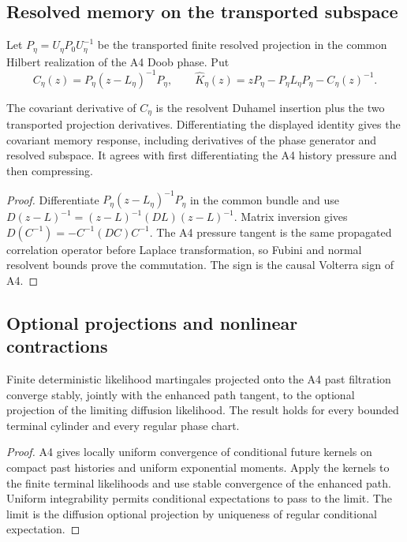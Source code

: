\subsection{Resolved memory on the transported subspace}

Let \(P_\eta=U_\eta P_0U_\eta^{-1}\) be the transported finite resolved
projection in the common Hilbert realization of the A4 Doob phase.  Put
\[
 C_\eta(z)=P_\eta(z-L_\eta)^{-1}P_\eta,
 \qquad
 \widehat K_\eta(z)=zP_\eta-P_\eta L_\eta P_\eta-C_\eta(z)^{-1}.
\]

\begin{theorem}
\label{thm:r10-c2-memory}
The covariant derivative of \(C_\eta\) is the resolvent Duhamel insertion plus
the two transported projection derivatives.  Differentiating the displayed
identity gives the covariant memory response, including derivatives of the
phase generator and resolved subspace.  It agrees with first differentiating
the A4 history pressure and then compressing.
\end{theorem}

\begin{proof}
Differentiate
\(P_\eta(z-L_\eta)^{-1}P_\eta\) in the common bundle and use
\(D(z-L)^{-1}=(z-L)^{-1}(DL)(z-L)^{-1}\).  Matrix inversion gives
\(D(C^{-1})=-C^{-1}(DC)C^{-1}\).  The A4 pressure tangent is the same
propagated correlation operator before Laplace transformation, so Fubini and
normal resolvent bounds prove the commutation.  The sign is the causal
Volterra sign of A4.
\end{proof}

\subsection{Optional projections and nonlinear contractions}

\begin{theorem}
\label{thm:r10-c2-optional}
Finite deterministic likelihood martingales projected onto the A4 past
filtration converge stably, jointly with the enhanced path tangent, to the
optional projection of the limiting diffusion likelihood.  The result holds
for every bounded terminal cylinder and every regular phase chart.
\end{theorem}

\begin{proof}
A4 gives locally uniform convergence of conditional future kernels on compact
past histories and uniform exponential moments.  Apply the kernels to the
finite terminal likelihoods and use stable convergence of the enhanced path.
Uniform integrability permits conditional expectations to pass to the limit.
The limit is the diffusion optional projection by uniqueness of regular
conditional expectation.
\end{proof}

